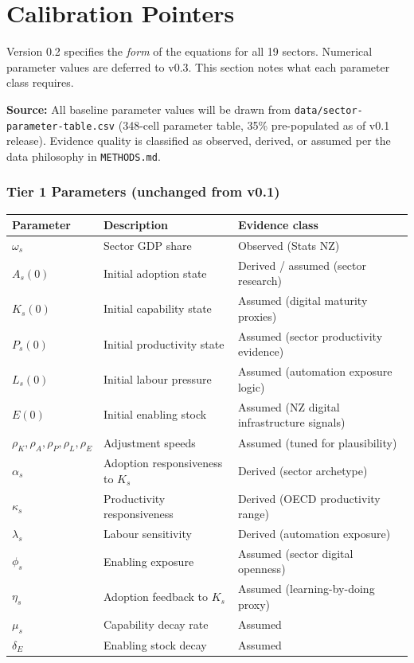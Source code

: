 \documentclass[11pt,a4paper]{article}
\begin{document}
\section{Calibration Pointers}

Version 0.2 specifies the \emph{form} of the equations for all 19 sectors. Numerical parameter values are deferred to v0.3. This section notes what each parameter class requires.

\textbf{Source:} All baseline parameter values will be drawn from \texttt{data/sector-parameter-table.csv} (348-cell parameter table, 35\% pre-populated as of v0.1 release). Evidence quality is classified as observed, derived, or assumed per the data philosophy in \texttt{METHODS.md}.

\subsubsection*{Tier 1 Parameters (unchanged from v0.1)}

\begin{center}
\begin{tabular}{lll}
\toprule
Parameter & Description & Evidence class \\
\midrule
$\omega_s$ & Sector GDP share & Observed (Stats NZ) \\
$A_s(0)$ & Initial adoption state & Derived / assumed (sector research) \\
$K_s(0)$ & Initial capability state & Assumed (digital maturity proxies) \\
$P_s(0)$ & Initial productivity state & Assumed (sector productivity evidence) \\
$L_s(0)$ & Initial labour pressure & Assumed (automation exposure logic) \\
$E(0)$ & Initial enabling stock & Assumed (NZ digital infrastructure signals) \\
$\rho_K, \rho_A, \rho_P, \rho_L, \rho_E$ & Adjustment speeds & Assumed (tuned for plausibility) \\
$\alpha_s$ & Adoption responsiveness to $K_s$ & Derived (sector archetype) \\
$\kappa_s$ & Productivity responsiveness & Derived (OECD productivity range) \\
$\lambda_s$ & Labour sensitivity & Derived (automation exposure) \\
$\phi_s$ & Enabling exposure & Assumed (sector digital openness) \\
$\eta_s$ & Adoption feedback to $K_s$ & Assumed (learning-by-doing proxy) \\
$\mu_s$ & Capability decay rate & Assumed \\
$\delta_E$ & Enabling stock decay & Assumed \\
\bottomrule
\end{tabular}
\end{center}
\end{document}

